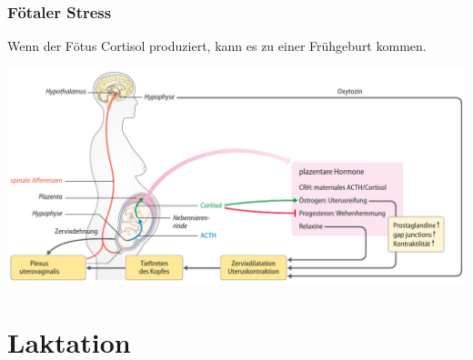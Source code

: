 \documentclass{beamer}
\begin{document}
\begin{frame}
\frametitle{Fötaler Stress }

Wenn der Fötus Cortisol produziert, kann es zu einer Frühgeburt kommen. 

\begin{center}
\includegraphics[width=\textwidth]{geburt_hormone}
\end{center}

\end{frame}

\section{Laktation}








\end{document}
